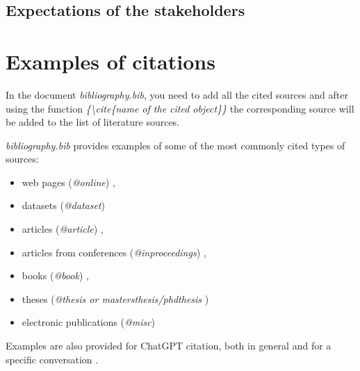 \documentclass[]{VUMIFTemplateClass}
\begin{document}
\subsection{Expectations of the stakeholders}











\printbibliography[title = {References and sources}]

\appendix
\renewcommand{\thesection}{Appendix \arabic{section}. }

\section{\phantom{Appendix} Examples of citations}
In the document \textit{bibliography.bib}, you need to add all the cited sources and after using the function \textit{\{\textbackslash cite\{name of the cited object\}\}} the corresponding source will be added to the list of literature sources.


\textit{bibliography.bib} provides examples of some of the most commonly cited types of sources:
\begin{itemize}
    \item web pages (\textit{@online}) \cite{PvzInternetinisPuslapis},
    \item datasets (\textit{@dataset}) \cite{dataset}
    \item articles (\textit{@article}) \cite{PvzStraipsnLt, PvzStraipsnEn}, 
    \item articles from conferences (\textit{@inproceedings}) \cite{PvzKonfLt, PvzKonfEn}, 
    \item books (\textit{@book}) \cite{PvzKnygLt, PvzKnygEn}, 
    \item theses (\textit{@thesis or mastersthesis/phdthesis} \cite{PvzMagistrLt, PvzPhdEn})
    \item electronic publications (\textit{@misc}) \cite{PvzElPubLt, PvzElPubEn}
\end{itemize}

Examples are also provided for ChatGPT citation, both in general \cite{chatgpt_bendrai} and for a specific conversation \cite{chatgpt_pokalbis}.
\end{document}
